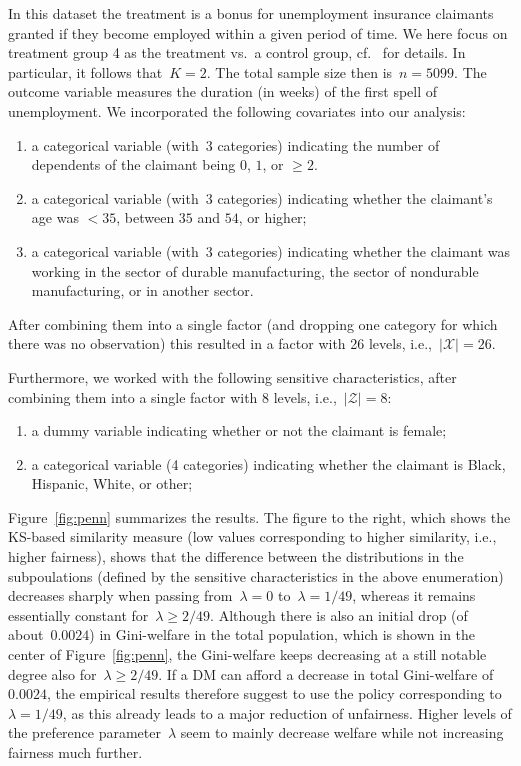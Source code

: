 \documentclass[11pt, a4paper]{article}
\theoremstyle{definition}
\begin{document}
In this dataset the treatment is a bonus for unemployment insurance claimants granted if they become employed within a given period of time. We here focus on treatment group 4 as the treatment vs.~a control group, cf.~\cite{bilias} for details. In particular, it follows that~$K = 2$. The total sample size then is~$n = 5099$. The outcome variable measures the duration (in weeks) of the first spell of unemployment. We incorporated the following covariates into our analysis: 
%
\begin{enumerate}
\item a categorical variable (with~$3$ categories) indicating the number of dependents of the claimant being $0$, $1$, or $\geq 2$.
\item a categorical variable (with~$3$ categories) indicating whether the claimant's age was $<35$, between $35$ and $54$, or higher;
\item a categorical variable (with~$3$ categories) indicating whether the claimant was working in the sector of durable manufacturing, the sector of nondurable manufacturing, or in another sector.
\end{enumerate}  
%
After combining them into a single factor (and dropping one category for which there was no observation) this resulted in a factor with 26 levels, i.e.,~$|\mathcal{X}| = 26$.

Furthermore, we worked with the following sensitive characteristics, after combining them into a single factor with 8 levels, i.e.,~$|\mathcal{Z}| = 8$:
%
\begin{enumerate}
\item a dummy variable indicating whether or not the claimant is female;
\item a categorical variable (4 categories) indicating whether the claimant is Black, Hispanic, White, or other; 
\end{enumerate}
%
Figure~\ref{fig:penn} summarizes the results. The figure to the right, which shows the KS-based similarity measure (low values corresponding to higher similarity, i.e., higher fairness), shows that the difference between the distributions in the subpoulations (defined by the sensitive characteristics in the above enumeration) decreases sharply when passing from~$\lambda = 0$ to~$\lambda = 1/49$, whereas it remains essentially constant for~$\lambda \geq 2/49$. Although there is also an initial drop (of about~$0.0024$) in Gini-welfare in the total population, which is shown in the center of Figure~\ref{fig:penn}, the Gini-welfare keeps decreasing at a still notable degree also for~$\lambda \geq 2/49$. If a DM can afford a decrease in total Gini-welfare of~$0.0024$, the empirical results therefore suggest to use the policy corresponding to~$\lambda = 1/49$, as this already leads to a major reduction of unfairness. Higher levels of the preference parameter~$\lambda$ seem to mainly decrease welfare while not increasing fairness much further.
\end{document}
